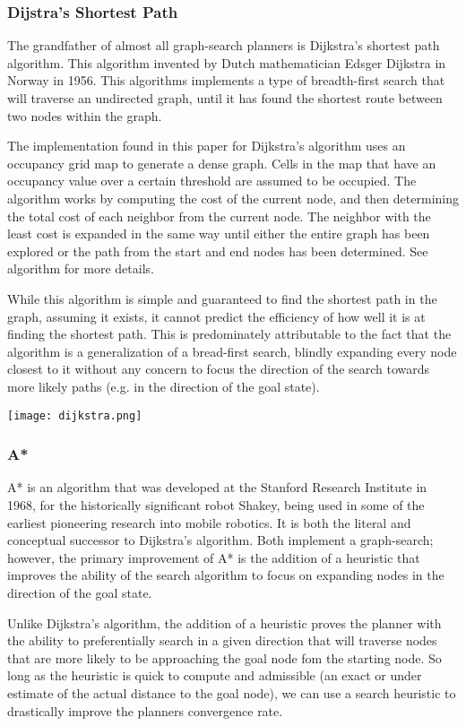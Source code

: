 \subsubsection{Dijstra's Shortest Path}
The grandfather of almost all graph-search planners is Dijkstra's shortest path algorithm. This algorithm invented by Dutch mathematician Edsger Dijkstra in Norway in 1956. This algorithms implements a type of breadth-first search that will traverse an undirected graph, until it has found the shortest route between two nodes within the graph. 

The implementation found in this paper for Dijkstra's algorithm uses an occupancy grid map to generate a dense graph. Cells in the map that have an occupancy value over a certain threshold are assumed to be occupied. The algorithm works by computing the cost of the current node, and then determining the total cost of each neighbor from the current node. The neighbor with the least cost is expanded in the same way until either the entire graph has been explored or the path from the start and end nodes has been determined. See algorithm for more details.

While this algorithm is simple and guaranteed to find the shortest path in the graph, assuming it exists, it cannot predict the efficiency of how well it is at finding the shortest path. This is predominately attributable to the fact that the algorithm is a generalization of a bread-first search, blindly expanding every node closest to it without any concern to focus the direction of the search towards more likely paths (e.g. in the direction of the goal state).

\texttt{[image: dijkstra.png]}

\subsubsection{A*}

A* is an algorithm that was developed at the Stanford Research Institute in 1968, for the historically significant robot Shakey, being used in some of the earliest pioneering research into mobile robotics. It is both the literal and conceptual successor to Dijkstra's algorithm. Both implement a graph-search; however, the primary improvement of A* is the addition of a heuristic that improves the ability of the search algorithm to focus on expanding nodes in the direction of the goal state.  

Unlike Dijkstra's algorithm, the addition of a heuristic proves the planner with the ability to preferentially search in a given direction that will traverse nodes that are more likely to be approaching the goal node fom the starting node. So long as the heuristic is quick to compute and admissible (an exact or under estimate of the actual distance to the goal node), we can use a search heuristic to drastically improve the planners convergence rate.

